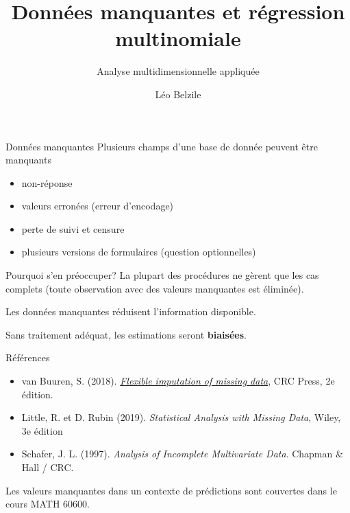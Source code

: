 \documentclass[
  ignorenonframetext,
]{beamer}
\title{Données manquantes et régression multinomiale}
\subtitle{Analyse multidimensionnelle appliquée}
\author{Léo Belzile}
\date{}
\institute{HEC Montréal}
\providecommand{\tightlist}{%
  \setlength{\itemsep}{0pt}\setlength{\parskip}{0pt}}\usepackage{longtable,booktabs,array}
\begin{document}
\frame{\titlepage}
\ifdefined\Shaded\renewenvironment{Shaded}{\begin{tcolorbox}[borderline west={3pt}{0pt}{shadecolor}, breakable, interior hidden, enhanced, sharp corners, boxrule=0pt, frame hidden]}{\end{tcolorbox}}\fi

\begin{frame}
\end{frame}

\begin{frame}{Données manquantes}
\protect\hypertarget{donnuxe9es-manquantes}{}
Plusieurs champs d'une base de donnée peuvent être manquants

\begin{itemize}
\tightlist
\item
  non-réponse
\item
  valeurs erronées (erreur d'encodage)
\item
  perte de suivi et censure
\item
  plusieurs versions de formulaires (question optionnelles)
\end{itemize}
\end{frame}

\begin{frame}{Pourquoi s'en préoccuper?}
\protect\hypertarget{pourquoi-sen-pruxe9occuper}{}
La plupart des procédures ne gèrent que les cas complets (toute
observation avec des valeurs manquantes est éliminée).

Les données manquantes réduisent l'information disponible.

Sans traitement adéquat, les estimations seront \textbf{biaisées}.
\end{frame}

\begin{frame}{Références}
\protect\hypertarget{ruxe9fuxe9rences}{}
\begin{itemize}
\tightlist
\item
  van Buuren, S. (2018).
  \href{https://stefvanbuuren.name/fimd/}{\emph{Flexible imputation of
  missing data}}, CRC Press, 2e édition.
\item
  Little, R. et D. Rubin (2019). \emph{Statistical Analysis with Missing
  Data}, Wiley, 3e édition
\item
  Schafer, J. L. (1997). \emph{Analysis of Incomplete Multivariate
  Data}. Chapman \& Hall / CRC.
\end{itemize}

Les valeurs manquantes dans un contexte de prédictions sont couvertes
dans le cours MATH 60600.
\end{frame}
\end{document}
